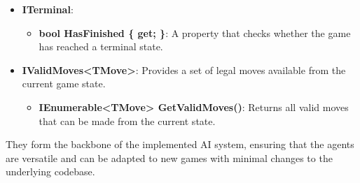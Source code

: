\begin{itemize}
    \item \textbf{ITerminal}:
        \begin{itemize}
            \item \textbf{bool HasFinished \{ get; \}}: A property that checks whether the game has reached a terminal state.
        \end{itemize}

    \item \textbf{IValidMoves\textless{}TMove\textgreater{}}: Provides a set of legal moves available from the current game state.
        \begin{itemize}
            \item \textbf{IEnumerable\textless{}TMove\textgreater{} GetValidMoves()}: Returns all valid moves that can be made from the current state.
        \end{itemize}
\end{itemize}

They form the backbone of the implemented \ac{AI} system, ensuring that the agents are versatile and can be adapted to new games with minimal changes to the underlying codebase.
